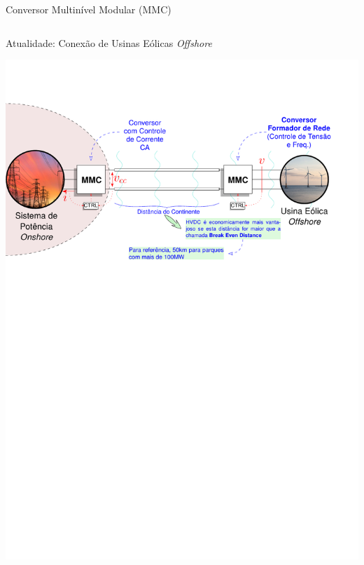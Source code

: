 \begin{frame}{Conversor Multinível Modular (MMC)}
\begin{columns}
\end{columns}



\end{frame}









\begin{frame}{Atualidade: Conexão de Usinas Eólicas {\it Offshore}}

\centering

\includegraphics[width=\linewidth]{./figuras/introducao/MMC-HVDC-2}


\end{frame}











